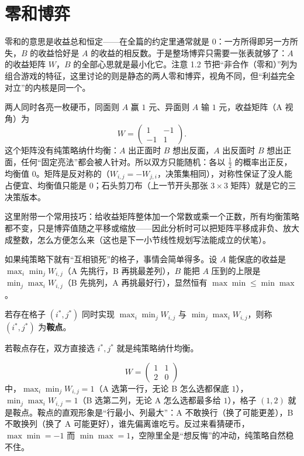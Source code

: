 \section{零和博弈}
零和的意思是收益总和恒定——在全篇的约定里通常就是 $0$：一方所得即另一方所失，$B$ 的收益恰好是 $A$ 的收益的相反数。于是整场博弈只需要一张表就够了：$A$ 的收益矩阵 $W$，$B$ 的全部心思就是最小化它。注意 1.2 节把“非合作（零和）”列为组合游戏的特征，这里讨论的则是静态的两人零和博弈，视角不同，但“利益完全对立”的内核是同一个。

\begin{example}\label{ex:pennies}
两人同时各亮一枚硬币，同面则 $A$ 赢 $1$ 元、异面则 $A$ 输 $1$ 元，收益矩阵（A 视角）为
\[
 W=\begin{pmatrix}1&-1\\-1&1\end{pmatrix}.
\]
这个矩阵没有纯策略纳什均衡：$A$ 出正面时 $B$ 想出反面，$A$ 出反面时 $B$ 想出正面，任何“固定亮法”都会被人针对。所以双方只能随机：各以 $\tfrac12$ 的概率出正反，均衡值 $0$。矩阵是反对称的（$W_{i,j}=-W_{j,i}$，决策集相同），对称性保证了没人能占便宜、均衡值只能是 $0$；石头剪刀布（上一节开头那张 $3\times3$ 矩阵）就是它的三决策版本。
\end{example}

这里附带一个常用技巧：给收益矩阵整体加一个常数或乘一个正数，所有均衡策略都不变，只是博弈值随之平移或缩放——因此分析时可以把矩阵平移成非负、放大成整数，怎么方便怎么来（这也是下一小节线性规划写法能成立的伏笔）。

如果纯策略下就有“互相锁死”的格子，事情会简单得多。设 $A$ 能保底的收益是 $\max_i\min_j W_{i,j}$（A 先挑行，B 再挑最差列），$B$ 能把 $A$ 压到的上限是 $\min_j\max_i W_{i,j}$（B 先挑列，A 再挑最好行），显然恒有 $\max\min\le\min\max$。

\begin{definition}[鞍点]
若存在格子 $(i^*,j^*)$ 同时实现 $\max_i\min_j W_{i,j}$ 与 $\min_j\max_i W_{i,j}$，则称 $(i^*,j^*)$ 为\textbf{鞍点}。
\end{definition}

若鞍点存在，双方直接选 $i^*,j^*$ 就是纯策略纳什均衡。

\begin{example}[鞍点]
\[
 W=\begin{pmatrix}1&1\\2&0\end{pmatrix}
\]
中，$\max_i\min_j W_{i,j}=1$（A 选第一行，无论 B 怎么选都保底 $1$），$\min_j\max_i W_{i,j}=1$（B 选第二列，无论 A 怎么选都最多给 $1$），格子 $(1,2)$ 就是鞍点。鞍点的直观形象是“行最小、列最大”：A 不敢换行（换了可能更差），B 不敢换列（换了 A 可能更好），谁先偏离谁吃亏。反过来看猜硬币，$\max\min=-1$ 而 $\min\max=1$，空隙里全是“想反悔”的冲动，纯策略自然稳不住。
\end{example}

